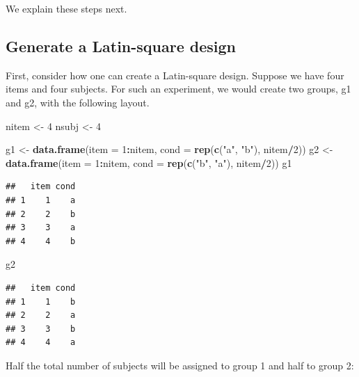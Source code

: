 \documentclass[12pt,]{krantz}
\newenvironment{Shaded}{\begin{snugshade}}{\end{snugshade}}
\newcommand{\DataTypeTok}[1]{\textcolor[rgb]{0.13,0.29,0.53}{#1}}
\newcommand{\DecValTok}[1]{\textcolor[rgb]{0.00,0.00,0.81}{#1}}
\newcommand{\KeywordTok}[1]{\textcolor[rgb]{0.13,0.29,0.53}{\textbf{#1}}}
\newcommand{\NormalTok}[1]{#1}
\newcommand{\OperatorTok}[1]{\textcolor[rgb]{0.81,0.36,0.00}{\textbf{#1}}}
\newcommand{\StringTok}[1]{\textcolor[rgb]{0.31,0.60,0.02}{#1}}
\begin{document}
We explain these steps next.

\hypertarget{generate-a-latin-square-design}{%
\subsection{Generate a Latin-square design}\label{generate-a-latin-square-design}}

First, consider how one can create a Latin-square design. Suppose we have four items and four subjects. For such an experiment, we would create two groups, g1 and g2, with the following layout.

\begin{Shaded}
\begin{Highlighting}[]
\NormalTok{nitem <-}\StringTok{ }\DecValTok{4}
\NormalTok{nsubj <-}\StringTok{ }\DecValTok{4}

\NormalTok{g1 <-}\StringTok{ }\KeywordTok{data.frame}\NormalTok{(}\DataTypeTok{item =} \DecValTok{1}\OperatorTok{:}\NormalTok{nitem, }\DataTypeTok{cond =} \KeywordTok{rep}\NormalTok{(}\KeywordTok{c}\NormalTok{(}\StringTok{"a"}\NormalTok{, }
  \StringTok{"b"}\NormalTok{), nitem}\OperatorTok{/}\DecValTok{2}\NormalTok{))}
\NormalTok{g2 <-}\StringTok{ }\KeywordTok{data.frame}\NormalTok{(}\DataTypeTok{item =} \DecValTok{1}\OperatorTok{:}\NormalTok{nitem, }\DataTypeTok{cond =} \KeywordTok{rep}\NormalTok{(}\KeywordTok{c}\NormalTok{(}\StringTok{"b"}\NormalTok{, }
  \StringTok{"a"}\NormalTok{), nitem}\OperatorTok{/}\DecValTok{2}\NormalTok{))}
\NormalTok{g1}
\end{Highlighting}
\end{Shaded}

\begin{verbatim}
##   item cond
## 1    1    a
## 2    2    b
## 3    3    a
## 4    4    b
\end{verbatim}

\begin{Shaded}
\begin{Highlighting}[]
\NormalTok{g2}
\end{Highlighting}
\end{Shaded}

\begin{verbatim}
##   item cond
## 1    1    b
## 2    2    a
## 3    3    b
## 4    4    a
\end{verbatim}

Half the total number of subjects will be assigned to group 1 and half to group 2:
\end{document}
